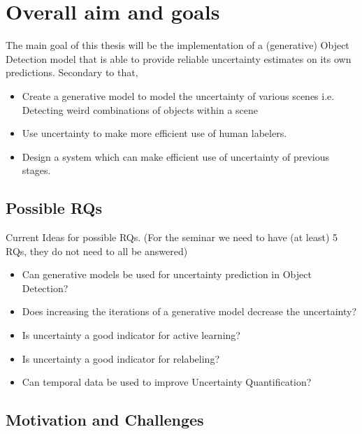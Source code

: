 \section{Overall aim and goals}\label{sec:goals}
The main goal of this thesis will be the implementation of a (generative) Object Detection model that is able to provide reliable uncertainty estimates on its own predictions. Secondary to that,
\begin{itemize}
    \item Create a generative model to model the uncertainty of various scenes
          \subitem i.e. Detecting weird combinations of objects within a scene
    \item Use uncertainty to make more efficient use of human labelers.
    \item Design a system which can make efficient use of uncertainty of previous stages.
\end{itemize}


\subsection{Possible RQs}
Current Ideas for possible RQs. (For the seminar we need to have (at least) 5 RQs, they do not need to all be answered)

\begin{itemize}
    \item Can generative models be used for uncertainty prediction in Object Detection?
    \item Does increasing the iterations of a generative model decrease the uncertainty?
    \item Is uncertainty a good indicator for active learning?
    \item Is uncertainty a good indicator for relabeling?
    \item Can temporal data be used to improve Uncertainty Quantification?
\end{itemize}

\subsection{Motivation and Challenges}

